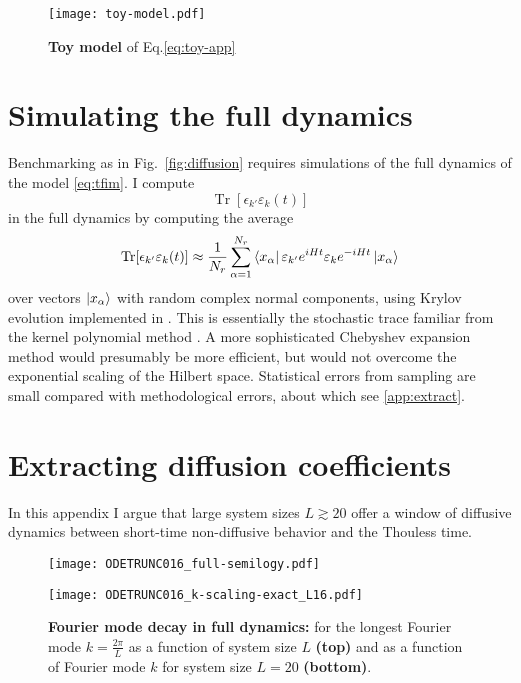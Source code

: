 \documentclass[aps,prb,nofootinbib,twocolumn,balancelastpage,amsmath,amssymb,floatfix,superscriptaddress,]{revtex4-1}
\newcommand{\tr}{\operatorname{Tr}}
\begin{document}
\begin{figure}[t!]
  \texttt{[image: toy-model.pdf]}
  \caption{\textbf{Toy model} of Eq.\eqref{eq:toy-app}}
  \label{fig:toy}
\end{figure}

\section{Simulating the full dynamics}\label{app:full}

Benchmarking as in Fig.~\ref{fig:diffusion} requires simulations of the full dynamics of the model \eqref{eq:tfim}.
I compute
\[ \tr [\epsilon_{k'} \varepsilon_k(t)] \]
in the full dynamics by computing the average
\begin{align}
  \tr [\epsilon_{k'} \varepsilon_k(t)]  \approx \frac 1 {N_r} \sum_{\alpha = 1}^{N_r} \bra {x_\alpha} \varepsilon_{k'} e^{iHt}\varepsilon_k e^{-iHt} \ket{x_\alpha}
\end{align}
over vectors $\ket{x_\alpha}$ with random complex normal components,
using Krylov evolution implemented in \cite{jutho_juthokrylovkitjl_2021}.
This is essentially the stochastic trace familiar from the kernel polynomial method
\cite{drabold_maximum_1993,silver_densities_1994,silver_calculation_1997,weisse_kernel_2006}.
A more sophisticated Chebyshev expansion method would presumably be more efficient,
but would not overcome the exponential scaling of the Hilbert space.
Statistical errors from sampling are small compared with methodological errors,
about which see \eqref{app:extract}.


\section{Extracting diffusion coefficients}\label{app:extract}

In this appendix I argue that large system sizes $L \gtrsim 20$
offer a window of diffusive dynamics between
short-time non-diffusive behavior
and the Thouless time.

\begin{figure}[t]
  \begin{minipage}{0.45\textwidth}
    \texttt{[image: ODETRUNC016\_full-semilogy.pdf]}
  \end{minipage}

  
  \begin{minipage}{0.45\textwidth}
    \texttt{[image: ODETRUNC016\_k-scaling-exact\_L16.pdf]}
  \end{minipage}

  \caption{
    \textbf{Fourier mode decay in full dynamics:} for the longest Fourier mode $k = \frac {2\pi}{L}$ as a function of system size $L$ \textbf{(top)} and as a function of Fourier mode $k$ for system size $L = 20$ \textbf{(bottom)}.
  }
  \label{fig:decay-exact-variables}
\end{figure}
\end{document}
